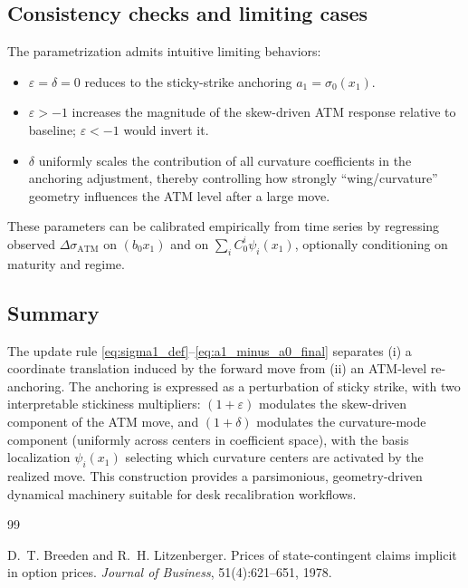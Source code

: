 \documentclass[11pt,a4paper]{report}
\begin{document}
\subsection{Consistency checks and limiting cases}
The parametrization admits intuitive limiting behaviors:
\begin{itemize}
\item $\varepsilon=\delta=0$ reduces to the sticky-strike anchoring $a_1=\sigma_0(x_1)$.
\item $\varepsilon>-1$ increases the magnitude of the skew-driven ATM response relative to baseline; $\varepsilon<-1$ would invert it.
\item $\delta$ uniformly scales the contribution of all curvature coefficients in the anchoring adjustment, thereby controlling how strongly ``wing/curvature'' geometry influences the ATM level after a large move.
\end{itemize}
These parameters can be calibrated empirically from time series by regressing observed $\Delta\sigma_{\mathrm{ATM}}$ on $(b_0 x_1)$ and on $\sum_i C_0^i\psi_i(x_1)$, optionally conditioning on maturity and regime.

\subsection{Summary}
The update rule \eqref{eq:sigma1_def}--\eqref{eq:a1_minus_a0_final} separates (i) a coordinate translation induced by the forward move from (ii) an ATM-level re-anchoring.
The anchoring is expressed as a perturbation of sticky strike, with two interpretable stickiness multipliers:
$(1+\varepsilon)$ modulates the skew-driven component of the ATM move, and $(1+\delta)$ modulates the curvature-mode component (uniformly across centers in coefficient space), with the basis localization $\psi_i(x_1)$ selecting which curvature centers are activated by the realized move.
This construction provides a parsimonious, geometry-driven dynamical machinery suitable for desk recalibration workflows.


\clearpage


% 

\begin{thebibliography}{99}

D.~T. Breeden and R.~H. Litzenberger.
\newblock Prices of state-contingent claims implicit in option prices.
\newblock \emph{Journal of Business}, 51(4):621--651, 1978.

\end{thebibliography}
\end{document}
